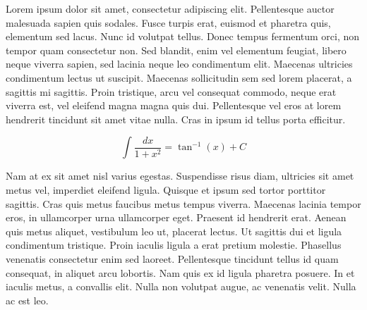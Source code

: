 Lorem ipsum dolor sit amet, consectetur adipiscing elit. Pellentesque auctor malesuada sapien quis sodales. Fusce turpis erat, euismod et pharetra quis, elementum sed lacus. Nunc id volutpat tellus. Donec tempus fermentum orci, non tempor quam consectetur non. Sed blandit, enim vel elementum feugiat, libero neque viverra sapien, sed lacinia neque leo condimentum elit. Maecenas ultricies condimentum lectus ut suscipit. Maecenas sollicitudin sem sed lorem placerat, a sagittis mi sagittis. Proin tristique, arcu vel consequat commodo, neque erat viverra est, vel eleifend magna magna quis dui. Pellentesque vel eros at lorem hendrerit tincidunt sit amet vitae nulla. Cras in ipsum id tellus porta efficitur.

\[
\int \frac{dx}{1 + x^{2}} = \tan^{-1}(x) + C
\]

Nam at ex sit amet nisl varius egestas. Suspendisse risus diam, ultricies sit amet metus vel, imperdiet eleifend ligula. Quisque et ipsum sed tortor porttitor sagittis. Cras quis metus faucibus metus tempus viverra. Maecenas lacinia tempor eros, in ullamcorper urna ullamcorper eget. Praesent id hendrerit erat. Aenean quis metus aliquet, vestibulum leo ut, placerat lectus. Ut sagittis dui et ligula condimentum tristique. Proin iaculis ligula a erat pretium molestie. Phasellus venenatis consectetur enim sed laoreet. Pellentesque tincidunt tellus id quam consequat, in aliquet arcu lobortis. Nam quis ex id ligula pharetra posuere. In et iaculis metus, a convallis elit. Nulla non volutpat augue, ac venenatis velit. Nulla ac est leo.




